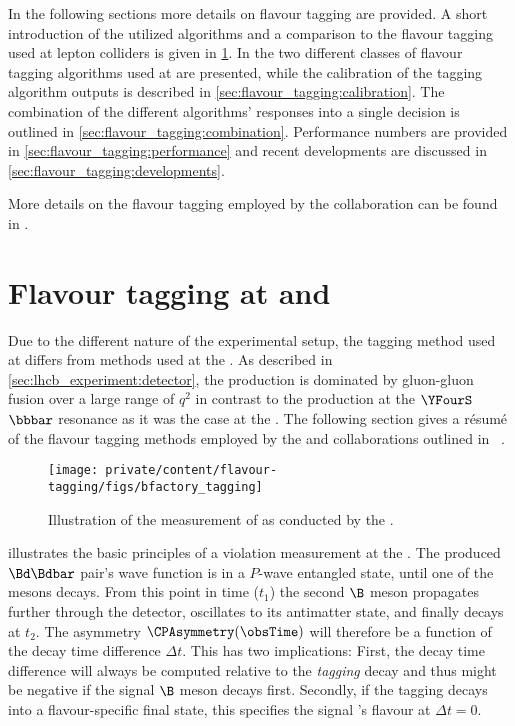 In the following sections more details on flavour tagging are provided. A short
introduction of the utilized algorithms and a comparison to the flavour tagging
used at lepton colliders is given in \cref{sec:flavour_tagging:b_factories}. In
 the two different classes of flavour tagging
algorithms used at \LHCb are presented, while the calibration of the tagging
algorithm outputs is described in
\cref{sec:flavour_tagging:calibration}. The combination of the different
algorithms' responses into a single decision is outlined in
\cref{sec:flavour_tagging:combination}. Performance numbers are provided in
\cref{sec:flavour_tagging:performance} and recent developments are discussed in
\cref{sec:flavour_tagging:developments}.

More details on the flavour tagging employed by the \LHCb collaboration can be
found in \cite{Aaij:2012mu,FT:RunI}.

\section{Flavour tagging at \Babar and \Belle}
\label{sec:flavour_tagging:b_factories}

Due to the different nature of the experimental setup, the tagging method used
at \LHCb differs from methods used at the \BFactories. As described in
\cref{sec:lhcb_experiment:detector}, the \bhadron production is dominated
by gluon-gluon fusion over a large range of $q^2$ in contrast to the production
at the $\YFourS$ $\bbbar$ resonance as it was the case at the \BFactories. The
following section gives a résumé of the flavour tagging methods employed by the
\Babar and \Belle collaborations outlined in \Ref~\cite[][Ch. 8]{Bevan:2014iga}.
%
\begin{figure}[h]
\centering
\texttt{[image: private/content/flavour-tagging/figs/bfactory\_tagging]}
\caption{Illustration of the measurement of \sintwobeta as conducted by the \BFactories.
}
\label{fig:flavour_tagging:lhcb:b_factory_basic_principles}
\end{figure}

 illustrates the basic
principles of a \CP violation measurement at the \BFactories. The produced
$\Bd\Bdbar$ pair's wave function is in a $P$-wave entangled state, until one of
the mesons decays. From this point in time ($t_1$) the second $\B$ meson
propagates further through the detector, oscillates to its antimatter state, and
finally decays at $t_2$. The \CP asymmetry $\CPAsymmetry(\obsTime)$ will
therefore be a function of the decay time difference $\Delta t$. This has two
implications: First, the decay time difference will always be computed relative
to the \emph{tagging} \Bmeson decay and thus might be negative if the signal
$\B$ meson decays first. Secondly, if the tagging \Bmeson decays into a
flavour-specific final state, this specifies the signal \Bmeson's flavour at
$\Delta t=0$.

